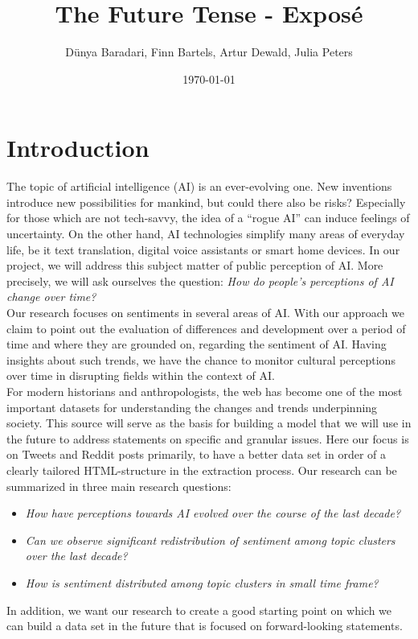 \documentclass[11pt]{article}
\title{The Future Tense - Exposé}
\author{Dünya Baradari, Finn Bartels, Artur Dewald, Julia Peters}
\date{\today}
\begin{document}
\maketitle
{}


\section{Introduction}
The topic of artificial intelligence (AI) is an ever-evolving one.
New inventions introduce new possibilities for mankind, but could there also be risks?
Especially for those which are not tech-savvy, the idea of a “rogue AI” can induce feelings of uncertainty.
On the other hand, AI technologies simplify many areas of everyday life, be it text translation, digital voice assistants or smart home devices.
In our project, we will address this subject matter of public perception of AI.
More precisely, we will ask ourselves the question:
\textit{How do people’s perceptions of AI change over time?}
\\
Our research focuses on sentiments in several areas of AI.
With our approach we claim to point out the evaluation of differences and development over a period of time and where they are grounded on, regarding the sentiment of AI.
Having insights about such trends, we have the chance to monitor cultural perceptions over time in disrupting fields within the context of AI.
\\
For modern historians and anthropologists, the web has become one of the most important datasets for understanding the changes and trends underpinning society.
This source will serve as the basis for building a model that we will use in the future to address statements on specific and granular issues.
Here our focus is on Tweets and Reddit posts primarily, to have a better data set in order of a clearly tailored HTML-structure in the extraction process.
Our research can be summarized in three main research questions:

\begin{itemize}
\item \textit{How have perceptions towards AI evolved over the course of the last decade?}
\item \textit{Can we observe significant redistribution of sentiment among topic clusters over the last decade?}
\item \textit{How is sentiment distributed among topic clusters in small time frame?}
\end{itemize}
%
In addition, we want our research to create a good starting point on which we can build a data set in the future that is focused on forward-looking statements.
\end{document}
